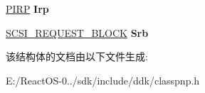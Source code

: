 \begin{DoxyCompactItemize}
\item 
\mbox{\label{struct___c_l_a_s_s___p_o_w_e_r___c_o_n_t_e_x_t_a1079cd0da0eb6d64bad0a0d3b8859213}} 
\hyperlink{interfacevoid}{P\+I\+RP} {\bfseries Irp}
\item 
\mbox{\label{struct___c_l_a_s_s___p_o_w_e_r___c_o_n_t_e_x_t_abf8c72377053f6ab1b83f8a42b2bf186}} 
\hyperlink{struct___s_c_s_i___r_e_q_u_e_s_t___b_l_o_c_k}{S\+C\+S\+I\+\_\+\+R\+E\+Q\+U\+E\+S\+T\+\_\+\+B\+L\+O\+CK} {\bfseries Srb}
\end{DoxyCompactItemize}


该结构体的文档由以下文件生成\+:\begin{DoxyCompactItemize}
\item 
E\+:/\+React\+O\+S-\/0../sdk/include/ddk/classpnp.\+h\end{DoxyCompactItemize}
